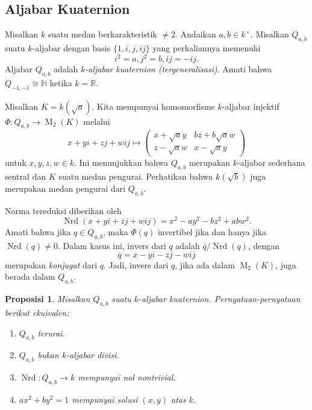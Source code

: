 \documentclass[12pt]{article}
\theoremstyle{plain}
\newtheorem{proposition}[theorem]{Proposisi}
\theoremstyle{definition}
\theoremstyle{remark}
\numberwithin{equation}{section}
\begin{document}
\subsection{Aljabar Kuaternion}

Misalkan $k$ suatu medan berkarakteristik $\ne 2$.
Andaikan $a,b \in k^\times$.
Misalkan $Q_{a,b}$ suatu $k$-aljabar dengan basis $\{1,i,j,ij\}$ yang
perkaliannya memenuhi
\[
i^2=a, j^2=b, ij=-ij .
\]
Aljabar $Q_{a,b}$ adalah \emph{$k$-aljabar kuaternion (tergeneralisasi)}.
Amati bahwa $Q_{-1,-1} \cong \mathbb{H}$ ketika $k=\mathbb{R}$.

Misalkan $K=k(\sqrt{a})$. Kita mempunyai homomorfisme $k$-aljabar
injektif $\Phi : Q_{a,b} \to \operatorname{M}_2(K)$ melalui
\[
x+yi+zj+wij \mapsto
\begin{pmatrix}
x+\sqrt{a}y & bz+b\sqrt{a}w\\
z-\sqrt{a}w & x-\sqrt{a}y
\end{pmatrix}
\]
untuk $x,y,z,w \in k$.
Ini menunjukkan bahwa $Q_{a,b}$ merupakan $k$-aljabar sederhana sentral dan $K$
suatu medan pengurai.
Perhatikan bahwa $k(\sqrt{b})$ juga merupakan medan pengurai dari $Q_{a,b}$.

Norma tereduksi diberikan oleh
\[
\operatorname{Nrd}(x+yi+zj+wij) = x^2-ay^2-bz^2+abw^2 .
\]
Amati bahwa jika $q \in Q_{a,b}$, maka $\Phi(q)$ invertibel
jika dan hanya jika $\operatorname{Nrd}(q) \ne 0$.
Dalam kasus ini, invers dari $q$ adalah
$\overline{q}/\operatorname{Nrd}(q)$, dengan
\[
\overline{q} = x-yi-zj-wij
\]
merupakan \emph{konjugat} dari $q$.
Jadi, invers dari $q$, jika ada dalam $\operatorname{M}_2(K)$,
juga berada dalam $Q_{a,b}$.

\begin{proposition}
Misalkan $Q_{a,b}$ suatu $k$-aljabar kuaternion.
Pernyataan-pernyataan berikut ekuivalen:
\begin{enumerate}
\item[(a)] $Q_{a,b}$ terurai.
\item[(b)] $Q_{a,b}$ bukan $k$-aljabar divisi.
\item[(c)] $\operatorname{Nrd} : Q_{a,b} \to k$ mempunyai nol nontrivial. 
\item[(d)] $ax^2+by^2=1$ mempunyai solusi $(x,y)$ atas $k$.
\end{enumerate}
\end{proposition}
\end{document}
